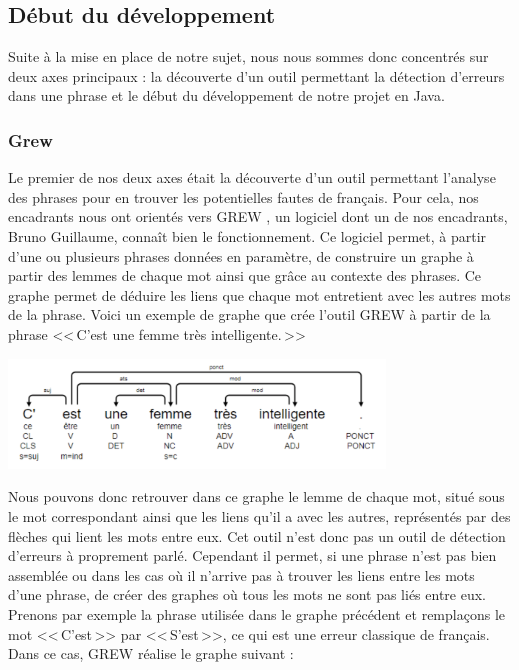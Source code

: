 \documentclass[11pt]{article}
\begin{document}
\subsection{D\'{e}but du d\'{e}veloppement}
Suite \`{a} la mise en place de notre sujet, nous nous sommes donc concentr\'{e}s sur deux axes principaux : la d\'{e}couverte d'un outil permettant la d\'{e}tection d'erreurs dans une phrase et le d\'{e}but du d\'{e}veloppement de notre projet en Java.

\subsubsection{Grew}
Le premier de nos deux axes \'{e}tait la d\'{e}couverte d'un outil permettant l'analyse des phrases pour en trouver les potentielles fautes de fran\c{c}ais. Pour cela, nos encadrants nous ont orient\'{e}s vers GREW \autocite[3]{http://grew.fr}, un logiciel dont un de nos encadrants, Bruno Guillaume, conna\^{i}t bien le fonctionnement. Ce logiciel permet, \`{a} partir d'une ou plusieurs phrases donn\'{e}es en param\`{e}tre, de construire un graphe \`{a} partir des lemmes de chaque mot ainsi que gr\^{a}ce au contexte des phrases. Ce graphe permet de d\'{e}duire les liens que chaque mot entretient avec les autres mots de la phrase. Voici un exemple de graphe que cr\'{e}e l'outil GREW \`{a} partir de la phrase <<\,C'est une femme tr\`{e}s intelligente.\,>>

\begin{center}
\includegraphics[width=10cm]{graphgrew.png} %
\end{center}

Nous pouvons donc retrouver dans ce graphe le lemme de chaque mot, situ\'{e} sous le mot correspondant ainsi que les liens qu'il a avec les autres, repr\'{e}sent\'{e}s par des fl\`{e}ches qui lient les mots entre eux. Cet outil n'est donc pas un outil de d\'{e}tection d'erreurs \`{a} proprement parl\'{e}. Cependant il permet, si une phrase n'est pas bien assembl\'{e}e ou dans les cas o\`{u} il n'arrive pas \`{a} trouver les liens entre les mots d'une phrase, de cr\'{e}er des graphes o\`{u} tous les mots ne sont pas li\'{e}s entre eux. Prenons par exemple la phrase utilis\'{e}e dans le graphe pr\'{e}c\'{e}dent et rempla\c{c}ons le mot <<\,C'est\,>> par <<\,S'est\,>>, ce qui est une erreur classique de fran\c{c}ais. Dans ce cas, GREW r\'{e}alise le graphe suivant :
\end{document}
